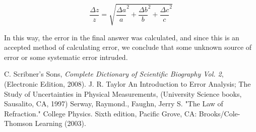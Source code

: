 \documentclass[aps,pre,twocolumn,nofootinbib]{revtex4}
\begin{document}
\begin{equation}
\label{multierror}
\frac{\Delta z}{z}=\sqrt{{\frac{\Delta a}{a}}^2+{\frac{\Delta b}{b}}^2+{\frac{\Delta c}{c}}^2}
\end{equation}

In this way, the error in the final answer was calculated, and since this is an accepted method of calculating error, we conclude that some unknown source of error or some systematic error intruded.  

	\begin{thebibliography}{99}
 C. Scribner's Sons, \textit{Complete Dictionary of Scientific Biography Vol. 2},
  (Electronic Edition, 2008).
 J. R. Taylor An Introduction to Error Analysis; The Study of Uncertainties in Physical Measurements, (University Science books, Sausalito, CA, 1997)
 Serway, Raymond., Faughn, Jerry S. "The Law of Refraction." College Physics. Sixth edition, Pacific Grove, CA: Brooks/Cole-Thomson Learning (2003).	
	\end{thebibliography}
\end{document}
